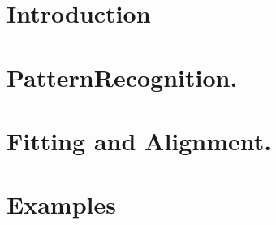 \documentclass[12pt,a4paper]{report}
\newif\
\newcommand{\twolinesahead}[5][]{
  \def\dist{6};
  \newdimen\ym;
  \newdimen\xm;
  \newdimen\yf;
  \newdimen\xf;
  \ExtractCoordinate{$(#3)$}{\xm}{\ym};
  \ExtractCoordinate{$(#2)$}{\xf}{\yf};
  \ifdim \ym < \yf
  \def\fac{1};
  \else
  \def\fac{-1};
  \fi
  \path [pline] ([yshift=-\dist * \fac]#2.east) -- (#3.west);
  \coordinate (m) at ($(#2)!0.5!(#3)$);
  \coordinate (mp) at ($(m)+(0,1em*\fac)$);
  \node (nm) at (mp) {#5};
  \foreach \x in {\fac,0}
  {
    \ifnum \x = 0
    \path [pline, decoration={markings, mark=at position 0.5 with {\arrow{triangle 60}}}, postaction={decorate}] ([yshift=\dist * \x]#2.east) -- ([yshift=\dist * \x]#4.west);
    \else
    \path [pline] ([yshift=\dist * \x]#2.east) -- ([yshift=\dist * \x]#4.west);
    \fi
  };
}
\begin{document}
\chapter{Introduction}

\clearpage


\chapter{PatternRecognition.}
\label{chp:patRec}

\clearpage
\chapter{Fitting and Alignment.}
\label{chp:gbl}

\clearpage
\chapter{Examples}
\label{example}

\clearpage
\end{document}
